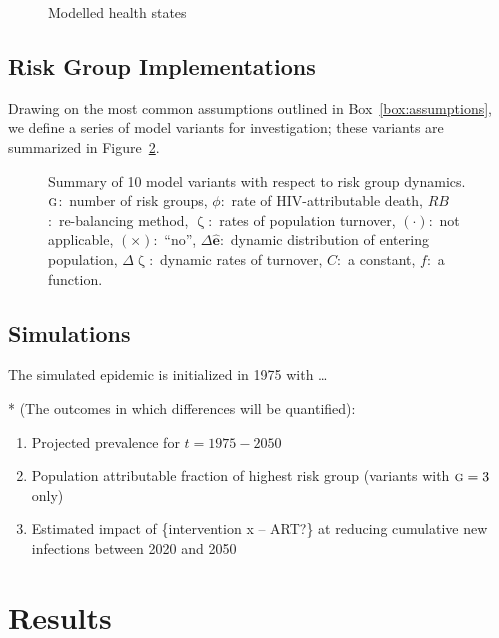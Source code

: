 \documentclass{article}
\numberwithin{equation}{section}
\renewcommand{\zeta}{\upzeta}
\newcommand{\e}{\hat{e}}
\newcommand{\G}{\textsc{g}}
\begin{document}
\begin{figure}
  \centering
  \caption{Modelled health states}\label{fig:health-states}
\end{figure}

\subsection{Risk Group Implementations}
Drawing on the most common assumptions outlined in Box~\ref{box:assumptions},
we define a series of model variants for investigation;
these variants are summarized in Figure~\ref{fig:variant-tree}.
\begin{figure}
  \centering
  \caption{Summary of 10 model variants with respect to risk group dynamics.
    $\G$:~number of risk groups,
    $\phi$:~rate of HIV-attributable death,
    $RB$:~re-balancing method,
    $\zeta$:~rates of population turnover,
    $(\cdot)$:~not applicable,
    $(\times)$:~``no'',
    $\Delta\bm{\e}$:~dynamic distribution of entering population,
    $\Delta\zeta$:~dynamic rates of turnover,
    $C$:~a constant,
    $f$:~a function.}
  \label{fig:variant-tree}
\end{figure}
\subsection{Simulations}
The simulated epidemic is initialized in 1975 with \dots

\par
* (The outcomes in which differences will be quantified):
\begin{enumerate}
  \item Projected prevalence for $t = 1975 - 2050$
  \item Population attributable fraction of highest risk group (variants with $\G = 3$ only)
  \item Estimated impact of \{intervention x -- ART?\} at reducing cumulative new infections between 2020 and 2050
\end{enumerate}

\clearpage
\section{Results}\label{s:results}
\end{document}
